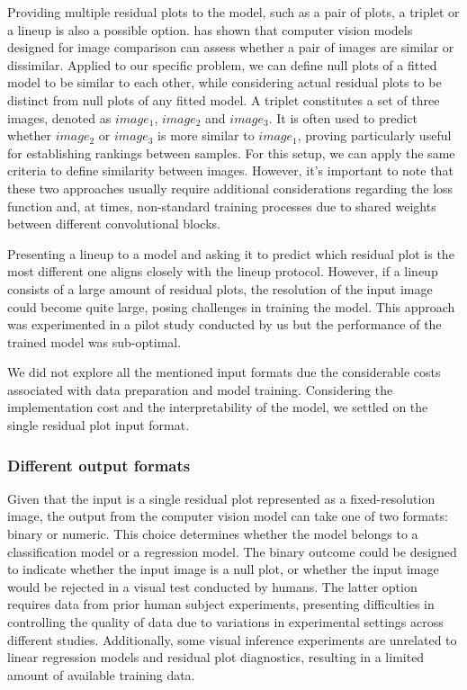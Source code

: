 \documentclass[]{interact}
\theoremstyle{plain}%
\theoremstyle{definition}
\theoremstyle{remark}
\begin{document}
Providing multiple residual plots to the model, such as a pair of plots,
a triplet or a lineup is also a possible option.
\citet{chopra2005learning} has shown that computer vision models
designed for image comparison can assess whether a pair of images are
similar or dissimilar. Applied to our specific problem, we can define
null plots of a fitted model to be similar to each other, while
considering actual residual plots to be distinct from null plots of any
fitted model. A triplet constitutes a set of three images, denoted as
\(image_1\), \(image_2\) and \(image_3\). It is often used to predict
whether \(image_2\) or \(image_3\) is more similar to \(image_1\),
proving particularly useful for establishing rankings between samples.
For this setup, we can apply the same criteria to define similarity
between images. However, it's important to note that these two
approaches usually require additional considerations regarding the loss
function and, at times, non-standard training processes due to shared
weights between different convolutional blocks.

Presenting a lineup to a model and asking it to predict which residual
plot is the most different one aligns closely with the lineup protocol.
However, if a lineup consists of a large amount of residual plots, the
resolution of the input image could become quite large, posing
challenges in training the model. This approach was experimented in a
pilot study conducted by us but the performance of the trained model was
sub-optimal.

We did not explore all the mentioned input formats due the considerable
costs associated with data preparation and model training. Considering
the implementation cost and the interpretability of the model, we
settled on the single residual plot input format.

\hypertarget{different-output-formats}{%
\subsubsection{Different output
formats}\label{different-output-formats}}

Given that the input is a single residual plot represented as a
fixed-resolution image, the output from the computer vision model can
take one of two formats: binary or numeric. This choice determines
whether the model belongs to a classification model or a regression
model. The binary outcome could be designed to indicate whether the
input image is a null plot, or whether the input image would be rejected
in a visual test conducted by humans. The latter option requires data
from prior human subject experiments, presenting difficulties in
controlling the quality of data due to variations in experimental
settings across different studies. Additionally, some visual inference
experiments are unrelated to linear regression models and residual plot
diagnostics, resulting in a limited amount of available training data.
\end{document}
